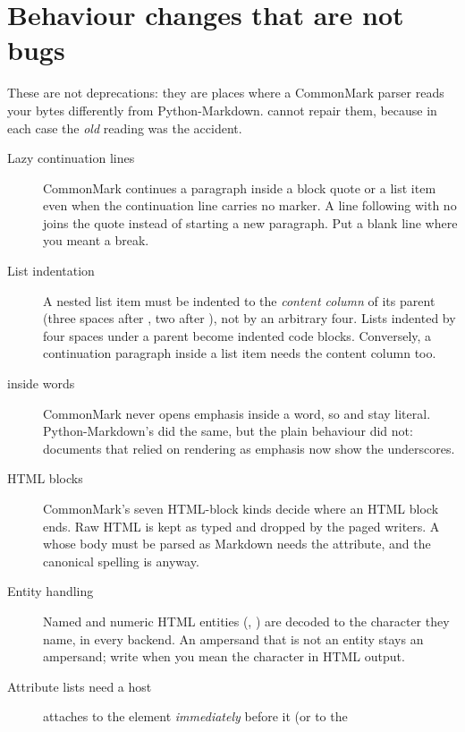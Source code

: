 \documentclass[a4paper,twoside]{article}
\begin{document}
\section{Behaviour changes that are not bugs}
These are not deprecations: they are places where a CommonMark parser reads
your bytes differently from Python-Markdown.  cannot repair
them, because in each case the \emph{old} reading was the accident.
\begin{description}
\item[{Lazy continuation lines}] CommonMark continues a paragraph inside a block quote or a list item even
when the continuation line carries no marker. A line following 
with no \tscodeinline{>} joins the quote instead of starting a new paragraph. Put a
blank line where you meant a break.
\item[{List indentation}] A nested list item must be indented to the \emph{content column} of its parent
(three spaces after , two after \tscodeinline{-\allowbreak{} }), not by an arbitrary four. Lists
indented by four spaces under a \tscodeinline{-\allowbreak{} } parent become indented code blocks.
Conversely, a continuation paragraph inside a list item needs the content
column too.
\item[{\tscodeinline{\_} inside words}] CommonMark never opens emphasis inside a word, so  and
 stay literal. Python-Markdown's  did the same,
but the plain  behaviour did not: documents that relied on
 rendering as emphasis now show the underscores.
\item[{HTML blocks}] CommonMark's seven HTML-block kinds decide where an HTML block ends. Raw
HTML is kept as typed and dropped by the paged writers. A  whose
body must be parsed as Markdown needs the  attribute, and the
canonical spelling is  anyway.
\item[{Entity handling}] Named and numeric HTML entities (, ) are decoded to the
character they name, in every backend. An ampersand that is not an entity
stays an ampersand; write  when you mean the character in HTML
output.
\item[{Attribute lists need a host}]  attaches to the element \emph{immediately} before it (or to the

\end{description}
\end{document}
